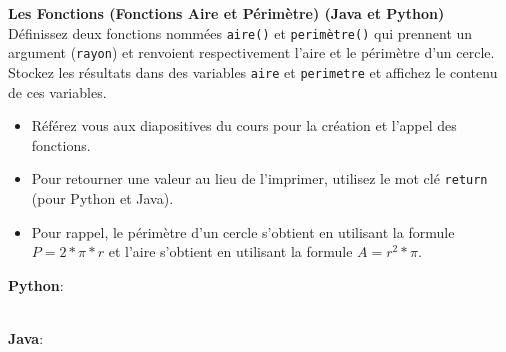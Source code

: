   \begin{Exercice}[5 minutes] \textbf{Les Fonctions (Fonctions Aire et Périmètre) (Java \textbf{et} Python)}\\
      Définissez deux fonctions nommées \lstinline{aire()} et \lstinline{perimètre()} qui prennent un argument (\lstinline{rayon}) et renvoient respectivement l'aire et le périmètre d'un cercle. Stockez les résultats dans des variables \lstinline{aire} et \lstinline{perimetre} et affichez le contenu de ces variables.   \\
     
      \begin{conseil}
          \begin{itemize}
              \item Référez vous aux diapositives du cours pour la création et l'appel des fonctions.
              \item Pour retourner une valeur au lieu de l'imprimer, utilisez le mot clé \lstinline{return} (pour Python et Java).
              \item Pour rappel, le périmètre d'un cercle s'obtient en utilisant la formule $P = 2*\pi*r$ et l'aire s'obtient en utilisant la formule $A = r^2*\pi$.
          \end{itemize}        
      \end{conseil}
      \begin{solution}
          \textbf{Python}:
          
          
          \textbf{\\Java}:
          
      \end{solution}   
  \end{Exercice} 

